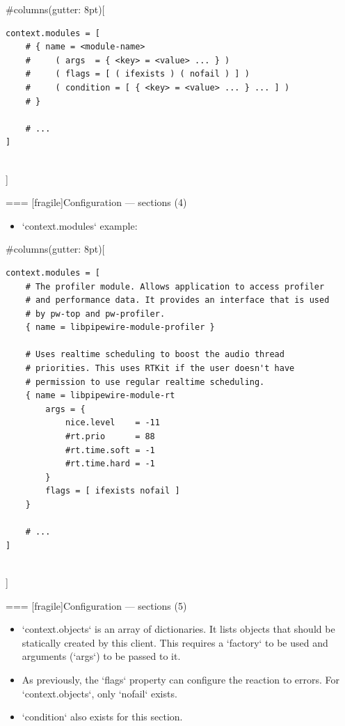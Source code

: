   
#columns(gutter: 8pt)[
    \begin{block}{}
      \fontsize{8}{8}\selectfont
        \begin{verbatim}
context.modules = [
    # { name = <module-name>
    #     ( args  = { <key> = <value> ... } )
    #     ( flags = [ ( ifexists ) ( nofail ) ] )
    #     ( condition = [ { <key> = <value> ... } ... ] )
    # }

    # ...
]
        \end{verbatim}
      \end{block}
  \\]





=== [fragile]{Configuration — sections (4)}

  \begin{itemize}
  \item `context.modules` example:
  \end{itemize}

  
#columns(gutter: 8pt)[
    \begin{block}{}
      \fontsize{8}{8}\selectfont
        \begin{verbatim}
context.modules = [
    # The profiler module. Allows application to access profiler
    # and performance data. It provides an interface that is used
    # by pw-top and pw-profiler.
    { name = libpipewire-module-profiler }

    # Uses realtime scheduling to boost the audio thread
    # priorities. This uses RTKit if the user doesn't have
    # permission to use regular realtime scheduling.
    { name = libpipewire-module-rt
        args = {
            nice.level    = -11
            #rt.prio      = 88
            #rt.time.soft = -1
            #rt.time.hard = -1
        }
        flags = [ ifexists nofail ]
    }

    # ...
]
        \end{verbatim}
      \end{block}
  \\]





=== [fragile]{Configuration — sections (5)}

  \begin{itemize}

  \item `context.objects` is an array of dictionaries. It lists
    objects that should be statically created by this client. This
    requires a `factory` to be used and arguments (`args`) to
    be passed to it.

  \item As previously, the `flags` property can configure the
    reaction to errors. For `context.objects`, only `nofail`
    exists.

  \item `condition` also exists for this section.

  \end{itemize}

